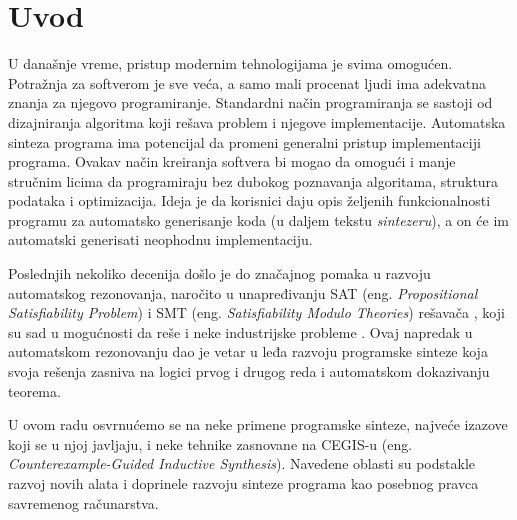 \section{Uvod}
\label{sec:uvod}

U današnje vreme, pristup modernim tehnologijama je svima omogućen. Potražnja za softverom je sve veća, a samo mali procenat ljudi ima adekvatna
znanja za njegovo programiranje. Standardni način programiranja se sastoji od dizajniranja algoritma koji rešava problem i njegove implementacije. Automatska sinteza programa ima potencijal da promeni generalni pristup implementaciji programa. Ovakav način kreiranja softvera bi mogao da omogući i manje stručnim licima da programiraju bez dubokog poznavanja algoritama, struktura podataka i optimizacija.
Ideja je da korisnici daju opis željenih funkcionalnosti programu za automatsko generisanje koda (u daljem tekstu \emph{sintezeru}), a on će im automatski generisati neophodnu implementaciju.

Poslednjih nekoliko decenija došlo je do značajnog pomaka u razvoju automatskog rezonovanja, naročito u unapređivanju SAT (eng. \emph{Propositional Satisfiability Problem}) i SMT (eng. \emph{Satisfiability Modulo Theories}) rešavača \cite{SMT}, koji su sad u mogućnosti da reše i neke industrijske probleme \cite{PSE}. Ovaj napredak u automatskom rezonovanju dao je vetar u leđa razvoju programske sinteze koja svoja rešenja zasniva na logici prvog i drugog reda i automatskom dokazivanju teorema.

U ovom radu osvrnućemo se na neke primene programske sinteze, najveće izazove koji se u njoj javljaju, i neke tehnike zasnovane na \mbox{CEGIS-u} (eng. \emph{Counterexample-Guided Inductive Synthesis}). Navedene oblasti su podstakle razvoj novih alata i doprinele razvoju sinteze programa kao posebnog pravca savremenog računarstva.
